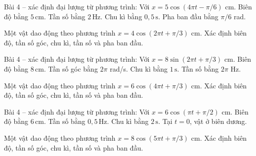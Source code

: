 \begin{ex}
Bài 4 – xác định đại lượng từ phương trình: Với $x=5\cos(4\pi t-\pi/6)$ cm.
\choiceTF
{\True Biên độ bằng $5\,\text{cm}$.}
{\True Tần số bằng $2\,\text{Hz}$.}
{\True Chu kì bằng $0,5\,\text{s}$.}
{Pha ban đầu bằng $\pi/6$ rad.}
\end{ex}

\begin{ex}
Một vật dao động theo phương trình $x=4\cos(2\pi t+\pi/3)$ cm. Xác định biên độ, tần số góc, chu kì, tần số và pha ban đầu.
\choiceTF

\end{ex}

\begin{ex}
Bài 4 – xác định đại lượng từ phương trình: Với $x=8\sin(2\pi t+\pi/3)$ cm.
\choiceTF
{\True Biên độ bằng $8\,\text{cm}$.}
{\True Tần số góc bằng $2\pi$ rad/s.}
{\True Chu kì bằng $1\,\text{s}$.}
{Tần số bằng $2\pi$ Hz.}
\end{ex}

\begin{ex}
Một vật dao động theo phương trình $x=6\cos(4\pi t+\pi/3)$ cm. Xác định biên độ, tần số góc, chu kì, tần số và pha ban đầu.
\choiceTF

\end{ex}

\begin{ex}
Bài 4 – xác định đại lượng từ phương trình: Với $x=6\cos(\pi t+\pi/2)$ cm.
\choiceTF
{\True Biên độ bằng $6\,\text{cm}$.}
{\True Tần số bằng $0,5\,\text{Hz}$.}
{\True Chu kì bằng $2\,\text{s}$.}
{Tại $t=0$, vật ở biên dương.}
\end{ex}

\begin{ex}
Một vật dao động theo phương trình $x=8\cos(5\pi t+\pi/3)$ cm. Xác định biên độ, tần số góc, chu kì, tần số và pha ban đầu.
\choiceTF

\end{ex}

